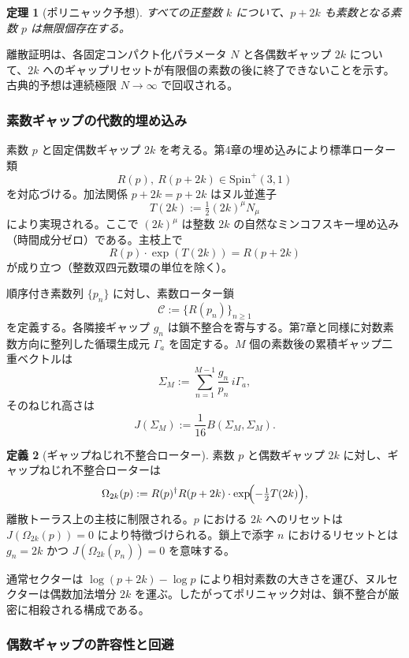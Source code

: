 \documentclass[dvipdfmx,a4paper]{article}
\newtheorem{theorem}{定理}[section]
\theoremstyle{definition}
\newtheorem{definition}[theorem]{定義}
\theoremstyle{remark}
\begin{document}
\begin{theorem}[ポリニャック予想]
\label{thm:polignac-classical-ja}
すべての正整数 $k$ について、$p + 2k$ も素数となる素数 $p$ は無限個存在する。
\end{theorem}

離散証明は、各固定コンパクト化パラメータ $N$ と各偶数ギャップ $2k$ について、$2k$ へのギャップリセットが有限個の素数の後に終了できないことを示す。古典的予想は連続極限 $N \to \infty$ で回収される。

\subsubsection{素数ギャップの代数的埋め込み}

素数 $p$ と固定偶数ギャップ $2k$ を考える。第4章の埋め込みにより標準ローター類
\[
R(p),\ R(p + 2k) \in \mathrm{Spin}^+(3,1)
\]
を対応づける。加法関係 $p + 2k = p + 2k$ はヌル並進子
\[
T(2k) := \tfrac12 (2k)^\mu N_\mu
\]
により実現される。ここで $(2k)^\mu$ は整数 $2k$ の自然なミンコフスキー埋め込み（時間成分ゼロ）である。主枝上で
\[
R(p) \cdot \exp(T(2k)) = R(p + 2k)
\]
が成り立つ（整数双四元数環の単位を除く）。

順序付き素数列 $\{p_n\}$ に対し、素数ローター鎖
\[
\mathcal{C} := \bigl\{ R(p_n) \bigr\}_{n \geq 1}
\]
を定義する。各隣接ギャップ $g_n$ は鎖不整合を寄与する。第7章と同様に対数素数方向に整列した循環生成元 $\Gamma_a$ を固定する。$M$ 個の素数後の累積ギャップ二重ベクトルは
\[
\Sigma_M := \sum_{n=1}^{M-1} \frac{g_n}{p_n}\, i\Gamma_a,
\]
そのねじれ高さは
\[
J(\Sigma_M) := \frac{1}{16} B(\Sigma_M, \Sigma_M).
\]

\begin{definition}[ギャップねじれ不整合ローター]
\label{def:gap-mismatch-ja}
素数 $p$ と偶数ギャップ $2k$ に対し、ギャップねじれ不整合ローターは
\[
\Omega_{2k}(p) := R(p)^\dagger R(p + 2k) \cdot \exp\!\Bigl( -\tfrac12 T(2k) \Bigr),
\]
離散トーラス上の主枝に制限される。$p$ における $2k$ へのリセットは $J(\Omega_{2k}(p)) = 0$ により特徴づけられる。鎖上で添字 $n$ におけるリセットとは $g_n = 2k$ かつ $J(\Omega_{2k}(p_n)) = 0$ を意味する。
\end{definition}

通常セクターは $\log(p + 2k) - \log p$ により相対素数の大きさを運び、ヌルセクターは偶数加法増分 $2k$ を運ぶ。したがってポリニャック対は、鎖不整合が厳密に相殺される構成である。

\subsubsection{偶数ギャップの許容性と回避}
\end{document}
